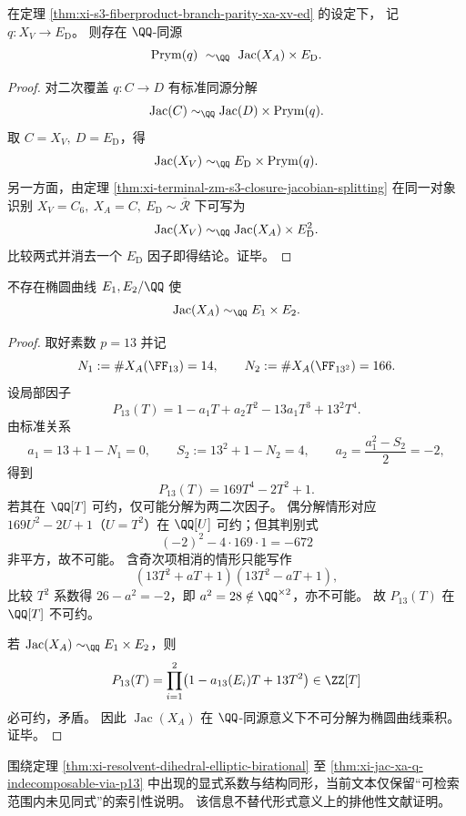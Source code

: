 \begin{theorem}\label{thm:xi-prym-q-decomposition-jacxa-ed}
在定理 \ref{thm:xi-s3-fiberproduct-branch-parity-xa-xv-ed} 的设定下，
记 \(q:X_V\to E_{\mathrm D}\)。
则存在 \(\QQ\)-同源
\[
\operatorname{Prym}(q)\ \sim_{\QQ}\ \operatorname{Jac}(X_A)\times E_{\mathrm D}.
\]
\end{theorem}
\begin{proof}
对二次覆盖 \(q:C\to D\) 有标准同源分解
\[
\operatorname{Jac}(C)\sim_{\QQ}\operatorname{Jac}(D)\times \operatorname{Prym}(q).
\]
取 \(C=X_V,\ D=E_{\mathrm D}\)，得
\[
\operatorname{Jac}(X_V)\sim_{\QQ}E_{\mathrm D}\times \operatorname{Prym}(q).
\]
另一方面，由定理 \ref{thm:xi-terminal-zm-s3-closure-jacobian-splitting}
在同一对象识别 \(X_V=C_6,\ X_A=C,\ E_{\mathrm D}\sim \overline{\mathcal R}\) 下可写为
\[
\operatorname{Jac}(X_V)\sim_{\QQ}\operatorname{Jac}(X_A)\times E_{\mathrm D}^{2}.
\]
比较两式并消去一个 \(E_{\mathrm D}\) 因子即得结论。证毕。
\end{proof}

\begin{theorem}\label{thm:xi-jac-xa-q-indecomposable-via-p13}
不存在椭圆曲线 \(E_1,E_2/\QQ\) 使
\[
\operatorname{Jac}(X_A)\sim_{\QQ}E_1\times E_2.
\]
\end{theorem}
\begin{proof}
取好素数 \(p=13\) 并记
\[
N_1:=\#X_A(\FF_{13})=14,\qquad N_2:=\#X_A(\FF_{13^2})=166.
\]
设局部因子
\[
P_{13}(T)=1-a_1T+a_2T^2-13a_1T^3+13^2T^4.
\]
由标准关系
\[
a_1=13+1-N_1=0,\qquad
S_2:=13^2+1-N_2=4,\qquad
a_2=\frac{a_1^2-S_2}{2}=-2,
\]
得到
\[
P_{13}(T)=169T^4-2T^2+1.
\]
若其在 \(\QQ[T]\) 可约，仅可能分解为两二次因子。
偶分解情形对应 \(169U^2-2U+1\)（\(U=T^2\)）在 \(\QQ[U]\) 可约；但其判别式
\[
(-2)^2-4\cdot169\cdot 1=-672
\]
非平方，故不可能。
含奇次项相消的情形只能写作
\[
(13T^2+aT+1)(13T^2-aT+1),
\]
比较 \(T^2\) 系数得 \(26-a^2=-2\)，即 \(a^2=28\notin\QQ^{\times2}\)，亦不可能。
故 \(P_{13}(T)\) 在 \(\QQ[T]\) 不可约。
\par
若 \(\operatorname{Jac}(X_A)\sim_{\QQ}E_1\times E_2\)，则
\[
P_{13}(T)=\prod_{i=1}^{2}\bigl(1-a_{13}(E_i)T+13T^2\bigr)
\in \ZZ[T]
\]
必可约，矛盾。
因此 \(\operatorname{Jac}(X_A)\) 在 \(\QQ\)-同源意义下不可分解为椭圆曲线乘积。证毕。
\end{proof}

\begin{remark}[同形公开索引核验说明]\label{rem:xi-ed-xa-xv-sameform-public-index-note}
围绕定理 \ref{thm:xi-resolvent-dihedral-elliptic-birational} 至
\ref{thm:xi-jac-xa-q-indecomposable-via-p13}
中出现的显式系数与结构同形，当前文本仅保留“可检索范围内未见同式”的索引性说明。
该信息不替代形式意义上的排他性文献证明。
\end{remark}

\endinput
